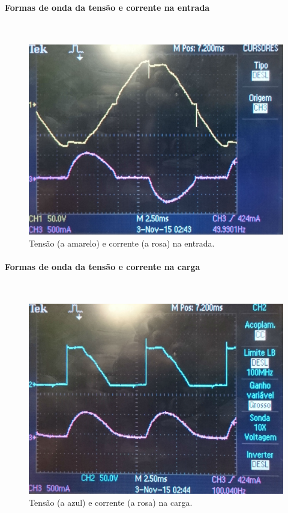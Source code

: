 \documentclass[a4paper,11pt]{article}
\numberwithin{equation}{section}
\begin{document}
\paragraph{Formas de onda da tensão e corrente na entrada} \mbox{}\

\begin{figure}[H]
	\centering
	\includegraphics[keepaspectratio=true, scale=0.12]{img/DSC_0190}
	\caption{Tensão (a amarelo) e corrente (a rosa) na entrada.}
	\label{fig:tcentradasemi}
	\vspace{-0.8em}
\end{figure}

\paragraph{Formas de onda da tensão e corrente na carga} \mbox{}\

\begin{figure}[H]
	\centering
	\includegraphics[keepaspectratio=true, scale=0.13]{img/DSC_0191}
	\caption{Tensão (a azul) e corrente (a rosa) na carga.}
	\label{fig:tccargasemi}
	\vspace{-0.8em}
\end{figure}
\end{document}

